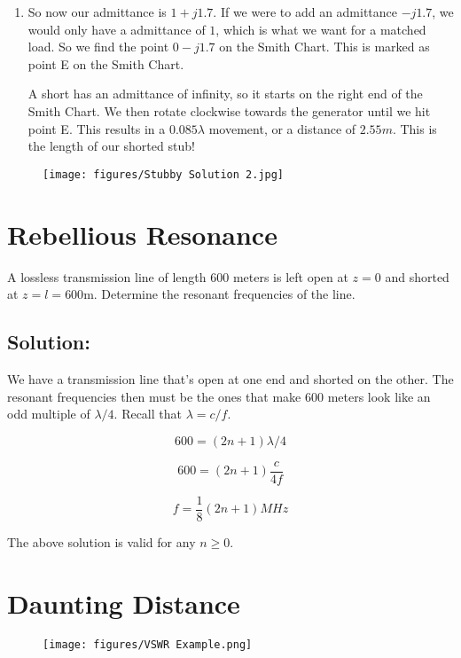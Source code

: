 \documentclass{article}
\begin{document}
\begin{enumerate}
    \item So now our admittance is $1 + j1.7$. If we were to add an admittance $-j1.7$, we would only have a admittance of $1$, which is what we want for a matched load. So we find the point $0 - j1.7$ on the Smith Chart. This is marked as point E on the Smith Chart.

    A short has an admittance of infinity, so it starts on the right end of the Smith Chart. We then rotate clockwise towards the generator until we hit point E. This results in a $0.085\lambda$ movement, or a distance of $\boxed{2.55 m}$. This is the length of our shorted stub!
    
\end{enumerate}

\begin{figure}[H]
\begin{center}
    \texttt{[image: figures/Stubby Solution 2.jpg]}
\end{center}
\end{figure}

\section{Rebellious Resonance}

A lossless transmission line of length 600 meters is left open at $z = 0$ and shorted at $z = l = 600$m. Determine the resonant frequencies of the line.

\subsection{Solution:}

We have a transmission line that's open at one end and shorted on the other. The resonant frequencies then must be the ones that make $600$ meters look like an odd multiple of $\lambda/4$. Recall that $\lambda = c/f$.

$$600 = (2n + 1) \lambda/4$$

$$600 = (2n + 1) \frac{c}{4f}$$

$$\boxed{f = \frac{1}{8} (2n + 1) MHz}$$

The above solution is valid for any $n \geq 0$.

\section{Daunting Distance}

\begin{figure}[H]
\begin{center}
    \texttt{[image: figures/VSWR Example.png]}
\end{center}
\end{figure}
\end{document}
